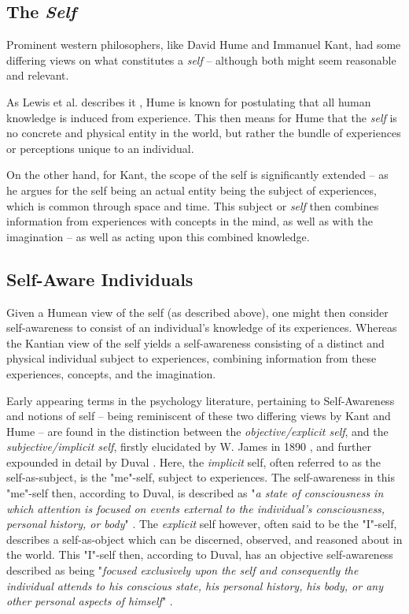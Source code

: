 	\subsection{The \textit{Self}}

	Prominent western philosophers, like David Hume and Immanuel Kant, had some differing views on what constitutes a \textit{self} -- although both might seem reasonable and relevant. 

	As Lewis et al. describes it \cite{sacs16_ch2}, Hume is known for postulating that all human knowledge is induced from experience. This then means for Hume that the \textit{self} is no concrete and physical entity in the world, but rather the bundle of experiences or perceptions unique to an individual.

	On the other hand, for Kant, the scope of the self is significantly extended -- as he argues for the self being an actual entity being the subject of experiences, which is common through space and time. This subject or \textit{self} then combines information from experiences with concepts in the mind, as well as with the imagination -- as well as acting upon this combined knowledge.


	\subsection{Self-Aware Individuals}

	Given a Humean view of the self (as described above), one might then consider self-awareness to consist of an individual's knowledge of its experiences. Whereas the Kantian view of the self yields a self-awareness consisting of a distinct and physical individual subject to experiences, combining information from these experiences, concepts, and the imagination.

	Early appearing terms in the psychology literature, pertaining to Self-Awareness and notions of self -- being reminiscent of these two differing views by Kant and Hume -- are found in the distinction between the \textit{objective/explicit self}, and the \textit{subjective/implicit self}, firstly elucidated by W. James in 1890 \cite{james_explicit_implicit_self}, and further expounded in detail by Duval \cite{duval111}. Here, the \textit{implicit} self, often referred to as the self-as-subject, is the "me"-self, subject to experiences. The self-awareness in this "me"-self then, according to Duval, is described as "\textit{a state of consciousness in which attention is focused on events external to the individual's consciousness, personal history, or body}" \cite{duval111}. The \textit{explicit} self however, often said to be the "I"-self, describes a self-as-object which can be discerned, observed, and reasoned about in the world. This "I"-self then, according to Duval, has an objective self-awareness described as being "\textit{focused exclusively upon the self and consequently the individual attends to his conscious state, his personal history, his body, or any other personal aspects of himself}" \cite{duval111}.

